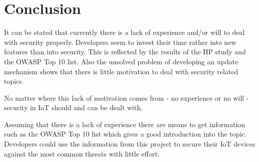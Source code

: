 \documentclass[conference]{IEEEtran}
\begin{document}
%





\section{Conclusion}
It can be stated that currently there is a lack of experience and/or will to 
deal with security properly. Developers seem to invest their time rather into 
new features than into security. This is reflected by the results of the HP 
study and the OWASP Top 10 list. Also the unsolved problem of developing an 
update mechanism shows that there is little motivation to deal with security 
related topics.

No matter where this lack of motivation comes from - no experience or no will - 
security in IoT should and can be dealt with.

Assuming that there is a lack of experience there are means to get information 
such as the OWASP Top 10 list which gives a good introduction into the topic. 
Developers could use the information from this project to secure their IoT 
devices against the most common threats with little effort.
\end{document}
